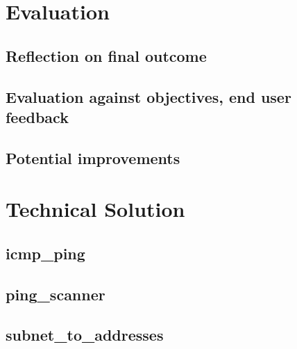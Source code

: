 \documentclass[titlepage]{article}
\let\Oldsection\section{}
\renewcommand{\section}{\FloatBarrier\Oldsection}
\let\Oldsubsection\subsection{}
\renewcommand{\subsection}{\FloatBarrier\Oldsubsection}
\begin{document}
\section{Evaluation}

\subsection{Reflection on final outcome}

\subsection{Evaluation against objectives, end user feedback}

\subsection{Potential improvements}

\appendix

\section{Technical Solution}\label{code}
\lstset{language=python}
\subsection{icmp\_ping}\label{app:icmpping}



\subsection{ping\_scanner}\label{app:pingscanner}


\subsection{subnet\_to\_addresses}\label{app:subnettoaddresses}

\end{document}
